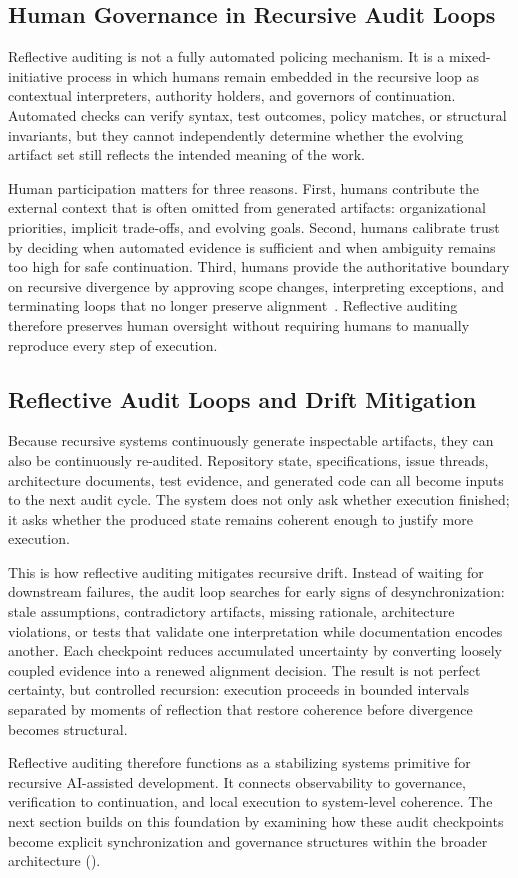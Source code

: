 \subsection{Human Governance in Recursive Audit Loops}

Reflective auditing is not a fully automated policing mechanism. It is a mixed-initiative process in which humans remain embedded in the recursive loop as contextual interpreters, authority holders, and governors of continuation. Automated checks can verify syntax, test outcomes, policy matches, or structural invariants, but they cannot independently determine whether the evolving artifact set still reflects the intended meaning of the work.

Human participation matters for three reasons. First, humans contribute the external context that is often omitted from generated artifacts: organizational priorities, implicit trade-offs, and evolving goals. Second, humans calibrate trust by deciding when automated evidence is sufficient and when ambiguity remains too high for safe continuation. Third, humans provide the authoritative boundary on recursive divergence by approving scope changes, interpreting exceptions, and terminating loops that no longer preserve alignment~\cite{Hutchins1995CognitionWild,Shneiderman2020HCAI}. Reflective auditing therefore preserves human oversight without requiring humans to manually reproduce every step of execution.

\subsection{Reflective Audit Loops and Drift Mitigation}

Because recursive systems continuously generate inspectable artifacts, they can also be continuously re-audited. Repository state, specifications, issue threads, architecture documents, test evidence, and generated code can all become inputs to the next audit cycle. The system does not only ask whether execution finished; it asks whether the produced state remains coherent enough to justify more execution.

This is how reflective auditing mitigates recursive drift. Instead of waiting for downstream failures, the audit loop searches for early signs of desynchronization: stale assumptions, contradictory artifacts, missing rationale, architecture violations, or tests that validate one interpretation while documentation encodes another. Each checkpoint reduces accumulated uncertainty by converting loosely coupled evidence into a renewed alignment decision. The result is not perfect certainty, but controlled recursion: execution proceeds in bounded intervals separated by moments of reflection that restore coherence before divergence becomes structural.

Reflective auditing therefore functions as a stabilizing systems primitive for recursive AI-assisted development. It connects observability to governance, verification to continuation, and local execution to system-level coherence. The next section builds on this foundation by examining how these audit checkpoints become explicit synchronization and governance structures within the broader  architecture ().
